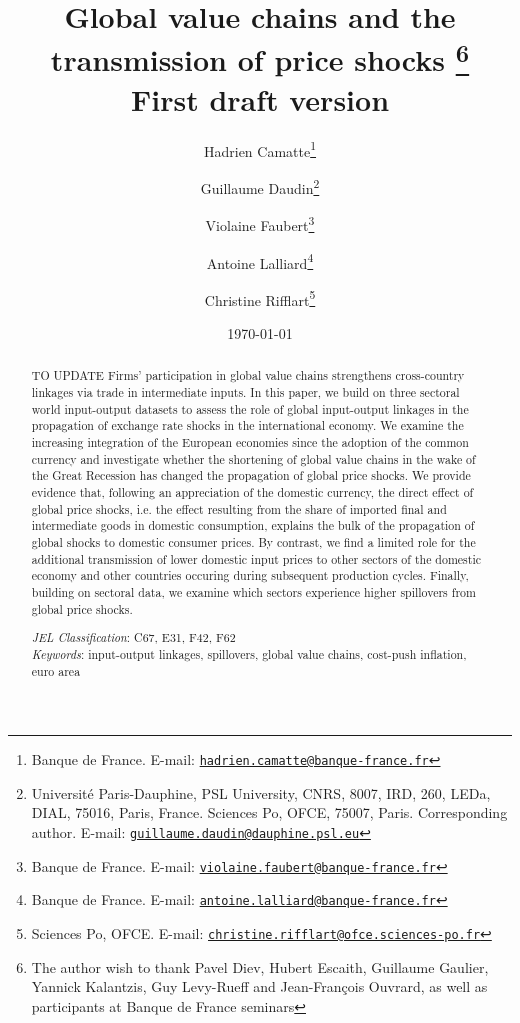 \documentclass[11pt,a4paper]{article}
\newcommand{\email}[1]{\href{mailto:#1}{\nolinkurl{#1}}}
\begin{document}
\title{Global value chains and the transmission of price shocks			\thanks{The author wish to thank Pavel Diev, Hubert Escaith, Guillaume Gaulier, Yannick Kalantzis, Guy Levy-Rueff and Jean-François Ouvrard, as well as participants at Banque de France seminars}\\
\vspace{1cm}
\normalsize{First draft version}
}
\vspace{1cm}
\date{\today}
\author{
	Hadrien Camatte\thanks{Banque de France. E-mail: \email{hadrien.camatte@banque-france.fr}}
	\and
	Guillaume Daudin\thanks{Université Paris-Dauphine, PSL University, CNRS, 8007, IRD, 260, LEDa, DIAL, 75016, Paris, France. Sciences Po, OFCE, 75007, Paris. Corresponding author. E-mail: \email{guillaume.daudin@dauphine.psl.eu}}
	\and
	Violaine Faubert\thanks{Banque de France. E-mail: \email{violaine.faubert@banque-france.fr}}
	\and
	Antoine Lalliard\thanks{Banque de France. E-mail: \email{antoine.lalliard@banque-france.fr}}
	\and
	Christine Rifflart\thanks{Sciences Po, OFCE. E-mail: \email{christine.rifflart@ofce.sciences-po.fr}}
}
\maketitle
\begin{abstract}
{\small \noindent
TO UPDATE
Firms' participation in global value chains strengthens cross-country linkages via trade in intermediate inputs. 
In this paper, we build on three sectoral world input-output datasets  to assess the role of global input-output linkages in the propagation of exchange rate shocks in the international economy. 
We examine the increasing integration of the European economies since the adoption of the common currency and investigate whether the shortening of global value chains in the wake of the Great Recession has changed the propagation of global price shocks. We provide evidence that, following an appreciation of the domestic currency, the direct effect of global price shocks, i.e. the effect resulting from the share of imported final and intermediate goods in domestic consumption, explains the bulk of the propagation of global shocks to domestic consumer prices. By contrast, we find a limited role for the additional transmission of lower domestic input prices to other sectors of the domestic economy and other countries occuring during subsequent production cycles. Finally, building on sectoral data, we examine which sectors experience higher spillovers from global price shocks.
}

{\small \bigskip \noindent \emph{JEL Classification}\/: C67, E31, F42, F62\\}
{\small \noindent \emph{Keywords}\/: input-output linkages, spillovers, global value chains, cost-push inflation, euro area \\ }
\end{abstract}
\end{document}
